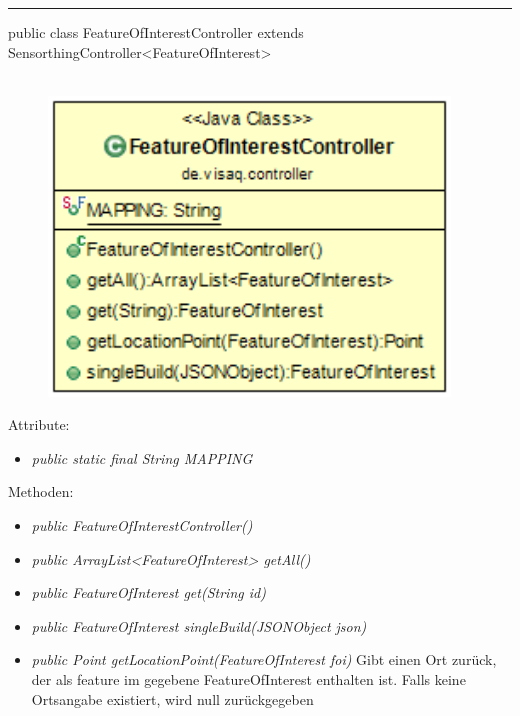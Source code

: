 \rule{\textwidth}{0.4pt}
public class FeatureOfInterestController extends SensorthingController<FeatureOfInterest>
\\\\
\begin{minipage}{0.4\textwidth}
    \begin{figure}[H]
        {\centering\includegraphics[width=0.95\textwidth]{media/backend/controller/classes/FeatureOfInterest.png}}
    \end{figure}
    \end{minipage} \hfill
\begin{minipage}{0.6\textwidth}
\end{minipage}

Attribute:
\begin{itemize}
    \item \emph{public static final String MAPPING} \mappingDescription
\end{itemize}
Methoden:
\begin{itemize}
    \item \emph{public FeatureOfInterestController()}
    \item \emph{public ArrayList<FeatureOfInterest> getAll()}
    \extendsSensorthingController
    \item \emph{public FeatureOfInterest get(String id)}
    \extendsSensorthingController
    \item \emph{public FeatureOfInterest singleBuild(JSONObject json)}
    \extendsSensorthingController
    \item \emph{public Point getLocationPoint(FeatureOfInterest foi)}
    Gibt einen Ort zurück, der als feature im gegebene FeatureOfInterest enthalten ist.
    Falls keine Ortsangabe existiert, wird null zurückgegeben
\end{itemize}

